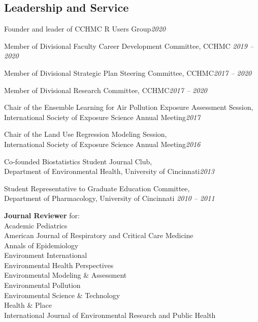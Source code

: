 \documentclass[margin,line]{res}
\newenvironment{list3}{
  \begin{list}{}{%
      \setlength{\itemsep}{0in}
      \setlength{\parsep}{0in} \setlength{\parskip}{0in}
      \setlength{\topsep}{0in} \setlength{\partopsep}{0in}
      \setlength{\leftmargin}{0in}}}{\end{list}}
\begin{document}
\begin{resume}
\section{\sc Leadership and Service}
\begin{list3} \itemsep 4pt
  \item[] Founder and leader of CCHMC R Users Group\hfill \textit{2020}
\item[] Member of Divisional Faculty Career Development Committee, CCHMC\hfill
  \textit{2019 -- 2020}
\item[] Member of Divisional Strategic Plan Steering Committee, CCHMC\hfill \textit{2017 -- 2020}
\item[] Member of Divisional Research Committee, CCHMC\hfill \textit{2017 -- 2020}
\item[] Chair of the Ensemble Learning for Air Pollution Exposure Assessment Session, \\International Society of Exposure Science Annual Meeting\hfill \textit{2017}
\item[] Chair of the Land Use Regression Modeling Session, \\International Society of Exposure Science Annual Meeting\hfill \textit{2016}
\item[] Co-founded Biostatistics Student Journal Club, \\Department of Environmental Health, University of Cincinnati\hfill \textit{2013}
\item[] Student Representative to Graduate Education Committee, \\Department of Pharmacology, University of Cincinnati \hfill \textit{2010 -- 2011}
\item[] \textbf{Journal Reviewer} for: \\
        Academic Pediatrics \\
        American Journal of Respiratory and Critical Care Medicine \\
        Annals of Epidemiology \\
        Environment International \\
        Environmental Health Perspectives \\
        Environmental Modeling \& Assessment \\
        Environmental Pollution \\
        Environmental Science \& Technology \\
        Health \& Place \\
        International Journal of Environmental Research and Public Health \\

\end{list3}
\end{resume}
\end{document}
